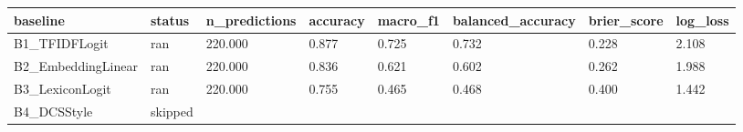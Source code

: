 \begin{tabular}{llllllll}
\toprule
baseline & status & n_predictions & accuracy & macro_f1 & balanced_accuracy & brier_score & log_loss \\
\midrule
B1_TFIDFLogit & ran & 220.000 & 0.877 & 0.725 & 0.732 & 0.228 & 2.108 \\
B2_EmbeddingLinear & ran & 220.000 & 0.836 & 0.621 & 0.602 & 0.262 & 1.988 \\
B3_LexiconLogit & ran & 220.000 & 0.755 & 0.465 & 0.468 & 0.400 & 1.442 \\
B4_DCSStyle & skipped &  &  &  &  &  &  \\
\bottomrule
\end{tabular}
